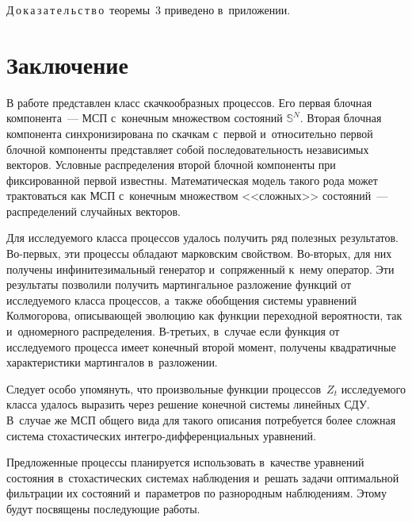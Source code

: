 \begin{multicols}{2}
\noindent
Д\,о\,к\,а\,з\,а\,т\,е\,л\,ь\,с\,т\,в\,о\ теоремы~3 приведено в~приложении.

\section{Заключение}

В работе представлен класс скачкообразных процессов. Его первая блочная 
компонента~--- МСП с~конечным множеством состояний $\mathbb{S}^N$. Вторая блочная 
компонента синхронизирована по скачкам с~первой и~относительно первой блочной 
компоненты представляет собой последовательность независимых векторов.
Условные распределения второй блочной компоненты при фиксированной первой 
известны. Математическая модель такого рода может трактоваться как МСП 
с~конечным множеством <<сложных>> состояний~--- распределений случайных векторов. 


Для исследуемого класса процессов удалось получить ряд полезных результатов. Во-пер\-вых, 
эти процессы обладают марковским свойством. Во-вто\-рых, для них получены 
инфинитезимальный генератор и~сопряженный к~нему оператор. Эти результаты 
позволили получить мартингальное разложение функций от исследуемого класса 
процессов, а~также обобщения сис\-те\-мы уравнений Колмогорова, описывающей эволюцию 
как функции переходной вероятности, так и~одномерного распределения. В-третьих, в~случае если функция от исследуемого процесса имеет конечный второй момент, 
получены квадратичные характеристики мартингалов в~разложении.

Следует особо упомянуть, что произвольные функции процессов~$Z_t$ исследуемого 
класса удалось выразить через решение конечной сис\-те\-мы линейных СДУ. В~случае же 
МСП общего вида для такого описания потребуется более сложная сис\-те\-ма 
стохастических ин\-тег\-ро-диф\-фе\-рен\-ци\-аль\-ных уравнений.

Предложенные процессы планируется использовать в~качестве уравнений состояния 
в~стохастических сис\-те\-мах наблюдения и~решать задачи оптимальной фильтрации их 
состояний и~па\-ра\-мет\-ров по разнородным наблюдениям. Этому будут посвящены 
последующие работы.



\end{multicols}
